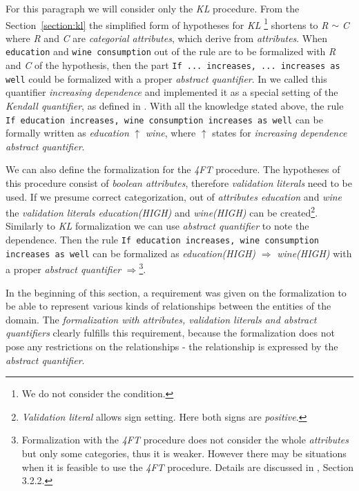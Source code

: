 \documentclass{llncs}
\begin{document}
For this paragraph we will consider only the \emph{KL} procedure. From the 
Section~\ref{section:kl} the simplified form of hypotheses for \emph{KL}
\footnote{We do not consider the condition.} shortens to \emph{R} $\sim$ \emph{C} 
where \emph{R} and \emph{C} are \emph{categorial attributes}, which derive
from \emph{attributes}. When \texttt{education} and \texttt{wine consumption}
out of the rule are to be formalized with \emph{R} and \emph{C} of the hypothesis,
then the part \texttt{If ... increases, ... increases as well} could be formalized with
a proper \emph{abstract quantifier}. In \cite{Diplomka} we called this quantifier
\emph{increasing dependence} and implemented it as a special setting of the 
\emph{Kendall quantifier}, as defined in \cite{KLKvant}. With all the knowledge
stated above, the rule \texttt{If education increases, wine consumption increases
as well} can be formally written as \emph{education} $\uparrow$ \emph{wine}, where
$\uparrow$ states for \emph{increasing dependence abstract quantifier}.

We can also define the formalization for the \emph{4FT} procedure. The hypotheses
of this procedure consist of \emph{boolean attributes}, therefore \emph{validation
literals} need to be used. If we presume correct categorization, out of
\emph{attributes education} and \emph{wine} the \emph{validation literals
education(HIGH)} and \emph{wine(HIGH)} can be created\footnote{\emph{Validation
literal} allows sign setting. Here both signs are \emph{positive}.}. Similarly
to \emph{KL} formalization we can use \emph{abstract quantifier} to 
note the dependence. Then the rule \texttt{If education increases, wine consumption
increases as well} can be formalized as \emph{education(HIGH)} $\Rightarrow$
\emph{wine(HIGH)} with a proper \emph{abstract quantifier} $\Rightarrow$\footnote{
Formalization with the \emph{4FT} procedure does not consider the whole \emph{attributes}
but only some categories, thus it is weaker. However there may be situations 
when it is feasible to use the \emph{4FT} procedure. Details are discussed in
\cite{Diplomka}, Section 3.2.2.}. 

In the beginning of this section, a requirement was given on the formalization
to be able to represent various kinds of relationships between the
entities of the domain. The \emph{formalization with attributes, validation 
literals and abstract quantifiers} clearly fulfills this requirement, because the
formalization does not pose any restrictions on the relationships - 
the relationship is expressed by the \emph{abstract quantifier}. 
\end{document}
